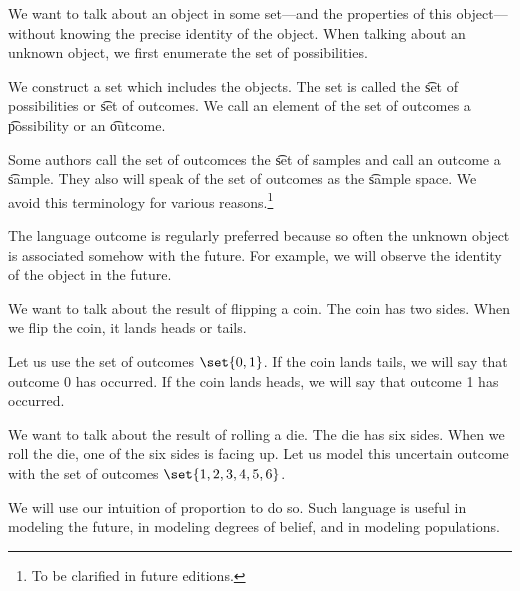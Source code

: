 

We want to talk about an object in some set---and the properties of this object---without knowing the precise identity of the object.
When talking about an unknown object, we first enumerate the set of possibilities.


We construct a set which includes the objects.
The set is called the \t{set of possibilities} or \t{set of outcomes}.
We call an element of the set of outcomes a \t{possibility} or an \t{outcome}.

Some authors call the set of outcomces the \t{set of samples} and call an outcome a \t{sample}.
They also will speak of the set of outcomes as the \t{sample space}.
We avoid this terminology for various reasons.\footnote{To be clarified in future editions.}

The language outcome is regularly preferred because so often the unknown object is associated somehow with the future.
For example, we will observe the identity of the object in the future.


We want to talk about the result of flipping a coin.
The coin has two sides.
When we flip the coin, it lands heads or tails.

Let us use the set of outcomes $\set{0, 1}$.
If the coin lands tails, we will say that outcome 0 has occurred.
If the coin lands heads, we will say that outcome 1 has occurred.


We want to talk about the result of rolling a die.
The die has six sides.
When we roll the die, one
of the six sides is facing
up.
Let us model this uncertain
outcome with the set of outcomes
$\set{1, 2, 3, 4, 5, 6}$.


We will use our intuition of proportion to do so.
Such language is useful in modeling the future, in modeling degrees of belief, and in modeling populations.

\blankpage
